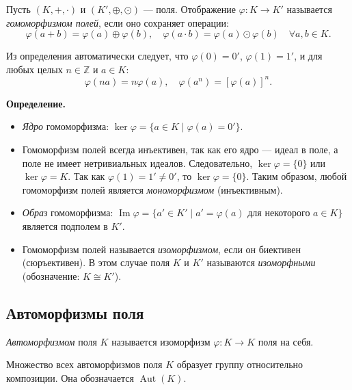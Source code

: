 \documentclass[a4paper,12pt]{article}
\theoremstyle{definition}
\theoremstyle{plain}
\theoremstyle{remark}
\begin{document}
	\begin{tcolorbox}[colback=yellow!5, colframe=orange!50!black, title=Определение]
		Пусть \( (K, +, \cdot) \) и \( (K', \oplus, \odot) \) — поля. Отображение \( \varphi: K \to K' \) называется \textit{гомоморфизмом полей}, если оно сохраняет операции:
		\[
		\varphi(a + b) = \varphi(a) \oplus \varphi(b), \quad \varphi(a \cdot b) = \varphi(a) \odot \varphi(b) \quad \forall a,b \in K.
		\]
	\end{tcolorbox}
	
	Из определения автоматически следует, что \( \varphi(0) = 0' \), \( \varphi(1) = 1' \), и для любых целых \( n \in \mathbb{Z} \) и \( a \in K \):
	\[
	\varphi(na) = n \varphi(a), \quad \varphi(a^n) = [\varphi(a)]^n.
	\]
	
	\medskip
	\noindent \textbf{Определение.}
	\begin{itemize}
		\item \textit{Ядро} гомоморфизма: \( \ker \varphi = \{ a \in K \mid \varphi(a) = 0' \} \).
		\item Гомоморфизм полей всегда инъективен, так как его ядро — идеал в поле, а поле не имеет нетривиальных идеалов. Следовательно, \( \ker \varphi = \{0\} \) или \( \ker \varphi = K \). Так как \( \varphi(1) = 1' \neq 0' \), то \( \ker \varphi = \{0\} \). Таким образом, любой гомоморфизм полей является \textit{мономорфизмом} (инъективным).
		\item \textit{Образ} гомоморфизма: \( \operatorname{Im} \varphi = \{ a' \in K' \mid a' = \varphi(a) \text{ для некоторого } a \in K \} \) является подполем в \( K' \).
		\item Гомоморфизм полей называется \textit{изоморфизмом}, если он биективен (сюръективен). В этом случае поля \( K \) и \( K' \) называются \textit{изоморфными} (обозначение: \( K \cong K' \)).
	\end{itemize}
	
	\subsection{Автоморфизмы поля}
	
	\begin{tcolorbox}[colback=red!5, colframe=red!50!black, title=Определение]
		\textit{Автоморфизмом} поля \( K \) называется изоморфизм \( \varphi: K \to K \) поля на себя.
	\end{tcolorbox}
	
	Множество всех автоморфизмов поля \( K \) образует группу относительно композиции. Она обозначается \( \operatorname{Aut}(K) \).
	
\end{document}
